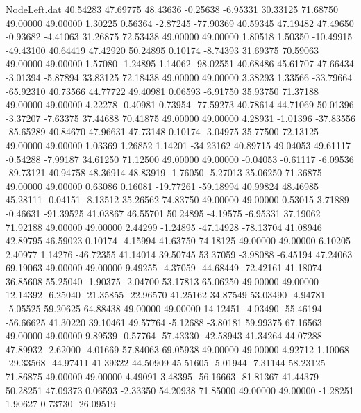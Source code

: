 \begin{filecontents}{NodeLeft.dat}
  40.54283   47.69775   48.43636    -0.25638   -6.95331   30.33125   71.68750   49.00000   49.00000    1.30225    0.56364   -2.87245  -77.90369
  40.59345   47.19482   47.49650    -0.93682   -4.41063   31.26875   72.53438   49.00000   49.00000    1.80518    1.50350  -10.49915  -49.43100
  40.64419   47.42920   50.24895     0.10174   -8.74393   31.69375   70.59063   49.00000   49.00000    1.57080   -1.24895    1.14062  -98.02551
  40.68486   45.61707   47.66434    -3.01394   -5.87894   33.83125   72.18438   49.00000   49.00000    3.38293    1.33566  -33.79664  -65.92310
  40.73566   44.77722   49.40981     0.06593   -6.91750   35.93750   71.37188   49.00000   49.00000    4.22278   -0.40981    0.73954  -77.59273
  40.78614   44.71069   50.01396    -3.37207   -7.63375   37.44688   70.41875   49.00000   49.00000    4.28931   -1.01396  -37.83556  -85.65289
  40.84670   47.96631   47.73148     0.10174   -3.04975   35.77500   72.13125   49.00000   49.00000    1.03369    1.26852    1.14201  -34.23162
  40.89715   49.04053   49.61117    -0.54288   -7.99187   34.61250   71.12500   49.00000   49.00000   -0.04053   -0.61117   -6.09536  -89.73121
  40.94758   48.36914   48.83919    -1.76050   -5.27013   35.06250   71.36875   49.00000   49.00000    0.63086    0.16081  -19.77261  -59.18994
  40.99824   48.46985   45.28111    -0.04151   -8.13512   35.26562   74.83750   49.00000   49.00000    0.53015    3.71889   -0.46631  -91.39525
  41.03867   46.55701   50.24895    -4.19575   -6.95331   37.19062   71.92188   49.00000   49.00000    2.44299   -1.24895  -47.14928  -78.13704
  41.08946   42.89795   46.59023     0.10174   -4.15994   41.63750   74.18125   49.00000   49.00000    6.10205    2.40977    1.14276  -46.72355
  41.14014   39.50745   53.37059    -3.98088   -6.45194   47.24063   69.19063   49.00000   49.00000    9.49255   -4.37059  -44.68449  -72.42161
  41.18074   36.85608   55.25040    -1.90375   -2.04700   53.17813   65.06250   49.00000   49.00000   12.14392   -6.25040  -21.35855  -22.96570
  41.25162   34.87549   53.03490    -4.94781   -5.05525   59.20625   64.88438   49.00000   49.00000   14.12451   -4.03490  -55.46194  -56.66625
  41.30220   39.10461   49.57764    -5.12688   -3.80181   59.99375   67.16563   49.00000   49.00000    9.89539   -0.57764  -57.43330  -42.58943
  41.34264   44.07288   47.89932    -2.62000   -4.01669   57.84063   69.05938   49.00000   49.00000    4.92712    1.10068  -29.33568  -44.97411
  41.39322   44.50909   45.51605    -5.01944   -7.31144   58.23125   71.86875   49.00000   49.00000    4.49091    3.48395  -56.16663  -81.81367
  41.44379   50.28251   47.09373     0.06593   -2.33350   54.20938   71.85000   49.00000   49.00000   -1.28251    1.90627    0.73730  -26.09519

\end{filecontents}
